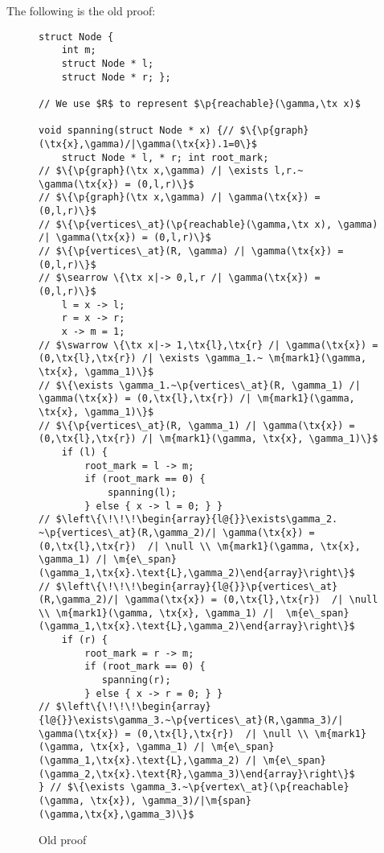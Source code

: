 \documentclass{article}
\newcommand{\tx}[1]{\text{#1}}
\newcommand{\p}[1]{\ensuremath{\mathsf{#1}}} %
\newcommand{\m}[1]{\ensuremath{\mathit{#1}}} %
\begin{document}
The following is the old proof:

\begin{figure}[t]
\begin{lstlisting}
struct Node {
    int m;
    struct Node * l;
    struct Node * r; };

// We use $R$ to represent $\p{reachable}(\gamma,\tx x)$

void spanning(struct Node * x) {// $\{\p{graph}(\tx{x},\gamma)/|\gamma(\tx{x}).1=0\}$
    struct Node * l, * r; int root_mark;
// $\{\p{graph}(\tx x,\gamma) /| \exists l,r.~ \gamma(\tx{x}) = (0,l,r)\}$
// $\{\p{graph}(\tx x,\gamma) /| \gamma(\tx{x}) = (0,l,r)\}$
// $\{\p{vertices\_at}(\p{reachable}(\gamma,\tx x), \gamma) /| \gamma(\tx{x}) = (0,l,r)\}$
// $\{\p{vertices\_at}(R, \gamma) /| \gamma(\tx{x}) = (0,l,r)\}$
// $\searrow \{\tx x|-> 0,l,r /| \gamma(\tx{x}) = (0,l,r)\}$
    l = x -> l;
    r = x -> r;
    x -> m = 1;
// $\swarrow \{\tx x|-> 1,\tx{l},\tx{r} /| \gamma(\tx{x}) = (0,\tx{l},\tx{r}) /| \exists \gamma_1.~ \m{mark1}(\gamma, \tx{x}, \gamma_1)\}$
// $\{\exists \gamma_1.~\p{vertices\_at}(R, \gamma_1) /| \gamma(\tx{x}) = (0,\tx{l},\tx{r}) /| \m{mark1}(\gamma, \tx{x}, \gamma_1)\}$
// $\{\p{vertices\_at}(R, \gamma_1) /| \gamma(\tx{x}) = (0,\tx{l},\tx{r}) /| \m{mark1}(\gamma, \tx{x}, \gamma_1)\}$
    if (l) {
        root_mark = l -> m;
        if (root_mark == 0) {
            spanning(l);
        } else { x -> l = 0; } }
// $\left\{\!\!\!\begin{array}{l@{}}\exists\gamma_2. ~\p{vertices\_at}(R,\gamma_2)/| \gamma(\tx{x}) = (0,\tx{l},\tx{r})  /| \null \\ \m{mark1}(\gamma, \tx{x}, \gamma_1) /| \m{e\_span}(\gamma_1,\tx{x}.\text{L},\gamma_2)\end{array}\right\}$
// $\left\{\!\!\!\begin{array}{l@{}}\p{vertices\_at}(R,\gamma_2)/| \gamma(\tx{x}) = (0,\tx{l},\tx{r})  /| \null \\ \m{mark1}(\gamma, \tx{x}, \gamma_1) /|  \m{e\_span}(\gamma_1,\tx{x}.\text{L},\gamma_2)\end{array}\right\}$
    if (r) {
        root_mark = r -> m;
        if (root_mark == 0) {
           spanning(r);
        } else { x -> r = 0; } }
// $\left\{\!\!\!\begin{array}{l@{}}\exists\gamma_3.~\p{vertices\_at}(R,\gamma_3)/| \gamma(\tx{x}) = (0,\tx{l},\tx{r})  /| \null \\ \m{mark1}(\gamma, \tx{x}, \gamma_1) /| \m{e\_span}(\gamma_1,\tx{x}.\text{L},\gamma_2) /| \m{e\_span}(\gamma_2,\tx{x}.\text{R},\gamma_3)\end{array}\right\}$
} // $\{\exists \gamma_3.~\p{vertex\_at}(\p{reachable}(\gamma, \tx{x}), \gamma_3)/|\m{span}(\gamma,\tx{x},\gamma_3)\}$
\end{lstlisting}
\caption{Old proof}
\end{figure}
\end{document}
